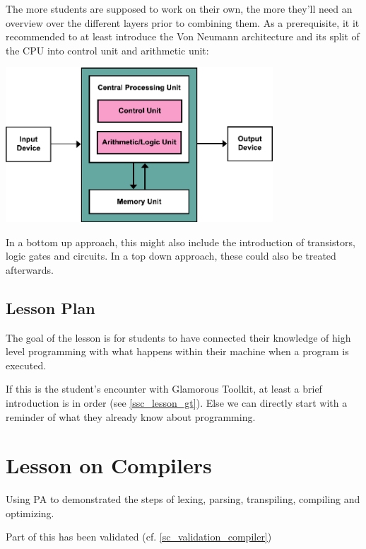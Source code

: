 The more students are supposed to work on their own, the more they'll need an overview over the different layers prior to combining them. As a prerequisite, it it recommended to at least introduce the Von Neumann architecture and its split of the CPU into control unit and arithmetic unit:

\begin{center}
\includegraphics[width=10cm]{images/Von_Neumann_Architecture.pdf}
\\ 
\end{center}

In a bottom up approach, this might also include the introduction of transistors, logic gates and circuits. In a top down approach, these could also be treated afterwards.


\subsection{Lesson Plan}

The goal of the lesson is for students to have connected their knowledge of high level programming with what happens within their machine when a program is executed.

If this is the student's encounter with Glamorous Toolkit, at least a brief introduction is in order (see \ref{ssc_lesson_gt}). Else we can directly start with a reminder of what they already know about programming.




\section{Lesson on Compilers} \label{sc_lesson_compiler}

Using PA to demonstrated the steps of lexing, parsing, transpiling, compiling and optimizing.

Part of this has been validated (cf. \ref{sc_validation_compiler})


